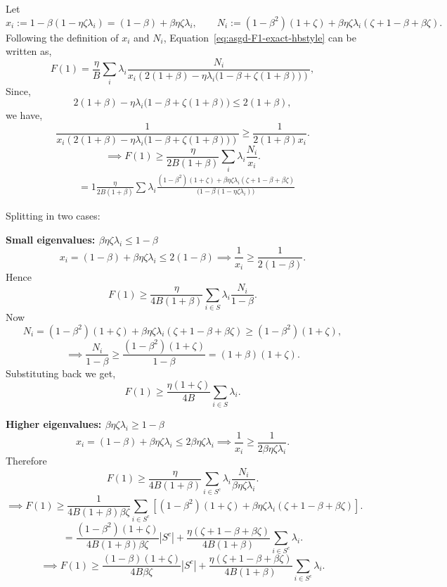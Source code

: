 \documentclass{article}
\begin{document}
Let
\[
x_i := 1-\beta(1-\eta\zeta\lambda_i) = (1-\beta)+\beta\eta\zeta\lambda_i,
\qquad
N_i := (1-\beta^2)(1+\zeta)+\beta\eta\zeta\lambda_i(\zeta+1-\beta+\beta\zeta).
\]
Following the definition of $x_i$ and $N_i$, Equation~\ref{eq:asgd-F1-exact-hbstyle} can be written as, 
\[
F(1)
=
\frac{\eta}{B}\sum_i \lambda_i
\frac{N_i}{x_i\left(2(1+\beta)-\eta\lambda_i\bigl(1-\beta+\zeta(1+\beta)\bigr)\right)},
\]
Since,
\[
2(1+\beta)-\eta\lambda_i\bigl(1-\beta+\zeta(1+\beta)\bigr)\le 2(1+\beta),
\]
we have,
\[
\frac{1}{x_i\left(2(1+\beta)-\eta\lambda_i\bigl(1-\beta+\zeta(1+\beta)\bigr)\right)}
\ge
\frac{1}{2(1+\beta)x_i}.
\]
\[
\implies F(1)
\ge
\frac{\eta}{2B(1+\beta)}
\sum_i \lambda_i \frac{N_i}{x_i}.
\]
\begin{align*}
&=1 \frac{\eta}{2B(1+\beta)} \sum \lambda_i \frac{(1-\beta^2)(1+\zeta) + \beta \eta \zeta \lambda_i(\zeta + 1 - \beta + \beta\zeta)}{\bigl(1 - \beta(1-\eta\zeta\lambda_i)\bigr)}
\end{align*}

Splitting in two cases:

\textbf{Small eigenvalues: $\beta\eta\zeta\lambda_i \leq 1-\beta$}
\[
x_i=(1-\beta)+\beta\eta\zeta\lambda_i \le 2(1-\beta) \implies
\frac{1}{x_i}\ge \frac{1}{2(1-\beta)}.
\]
Hence
\[
F(1)
\ge
\frac{\eta}{4B(1+\beta)}
\sum_{i\in S}\lambda_i \frac{N_i}{1-\beta}.
\]
Now
\[
N_i
=
(1-\beta^2)(1+\zeta)+\beta\eta\zeta\lambda_i(\zeta+1-\beta+\beta\zeta)
\ge
(1-\beta^2)(1+\zeta),
\]
\[
\implies \frac{N_i}{1-\beta}
\ge
\frac{(1-\beta^2)(1+\zeta)}{1-\beta}
=
(1+\beta)(1+\zeta).
\]
Substituting back we get,
\begin{equation}
F(1)
\ge
\frac{\eta(1+\zeta)}{4B}\sum_{i\in S}\lambda_i.
\label{eqn:small_eig}
\end{equation}

\textbf{Higher eigenvalues: $\beta\eta\zeta\lambda_i \geq 1-\beta$}
\[
x_i=(1-\beta)+\beta\eta\zeta\lambda_i \le 2\beta\eta\zeta\lambda_i \implies
\frac{1}{x_i}\ge \frac{1}{2\beta\eta\zeta\lambda_i}.
\]
Therefore
\[
F(1)
\ge
\frac{\eta}{4B(1+\beta)}
\sum_{i\in S^c}\lambda_i \frac{N_i}{\beta\eta\zeta\lambda_i}.
\]
\[
\implies F(1)
\ge
\frac{1}{4B(1+\beta)\beta\zeta}
\sum_{i\in S^c}
\left[(1-\beta^2)(1+\zeta)+\beta\eta\zeta\lambda_i(\zeta+1-\beta+\beta\zeta)\right].
\]
\[
=
\frac{(1-\beta^2)(1+\zeta)}{4B(1+\beta)\beta\zeta}|S^c|
+
\frac{\eta(\zeta+1-\beta+\beta\zeta)}{4B(1+\beta)}
\sum_{i\in S^c}\lambda_i.
\]
\begin{equation}
\implies F(1)
\ge
\frac{(1-\beta)(1+\zeta)}{4B\beta\zeta}|S^c|
+
\frac{\eta(\zeta+1-\beta+\beta\zeta)}{4B(1+\beta)}
\sum_{i\in S^c}\lambda_i.
\label{eqn:large_eig}
\end{equation}
\end{document}
